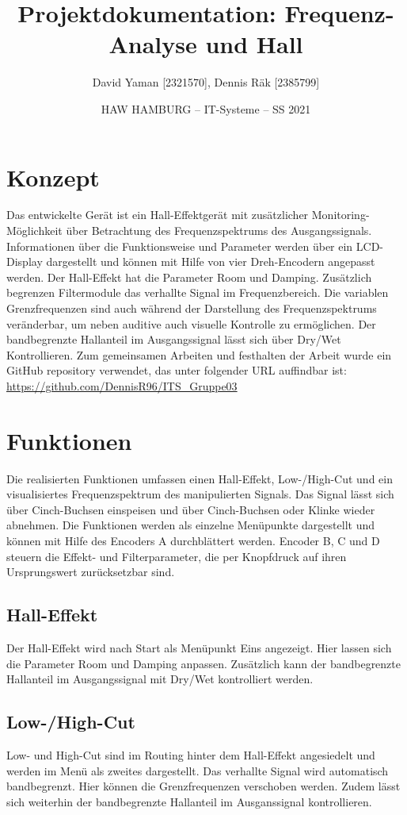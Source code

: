 \documentclass[12pt]{article}
\title{Projektdokumentation: Frequenz-Analyse und Hall}        %
\author{David Yaman [2321570], Dennis Räk [2385799]}            %
\date{HAW HAMBURG -- IT-Systeme -- SS 2021}                    %
\begin{document}
\maketitle
\newpage
\tableofcontents
\newpage
\section{Konzept}
Das entwickelte Gerät ist ein Hall-Effektgerät mit zusätzlicher Monitoring-Möglichkeit über Betrachtung des Frequenzspektrums des Ausgangssignals. 
Informationen über die Funktionsweise und Parameter werden über ein LCD-Display dargestellt und können mit Hilfe von vier Dreh-Encodern angepasst werden. 
Der Hall-Effekt hat die Parameter Room und Damping. Zusätzlich begrenzen Filtermodule das verhallte Signal im Frequenzbereich. 
Die variablen Grenzfrequenzen sind auch während der Darstellung des Frequenzspektrums veränderbar, um neben auditive auch visuelle Kontrolle zu ermöglichen. 
Der bandbegrenzte Hallanteil im Ausgangssignal lässt sich über Dry/Wet Kontrollieren. Zum gemeinsamen Arbeiten und festhalten der Arbeit wurde ein GitHub repository verwendet,
das unter folgender URL auffindbar ist:
\url{https://github.com/DennisR96/ITS_Gruppe03}
\section{Funktionen}
Die realisierten Funktionen umfassen einen Hall-Effekt, Low-/High-Cut und ein visualisiertes Frequenzspektrum des manipulierten Signals. 
Das Signal lässt sich über Cinch-Buchsen einspeisen und über Cinch-Buchsen oder Klinke wieder abnehmen.
Die Funktionen werden als einzelne Menüpunkte dargestellt und können mit Hilfe des Encoders A durchblättert werden. 
Encoder B, C und D steuern die Effekt- und Filterparameter, die per Knopfdruck auf ihren Ursprungswert zurücksetzbar sind.
\subsection{Hall-Effekt}
Der Hall-Effekt wird nach Start als Menüpunkt Eins angezeigt. 
Hier lassen sich die Parameter Room und Damping anpassen.
Zusätzlich kann der bandbegrenzte Hallanteil im Ausgangssignal mit Dry/Wet kontrolliert werden.
\subsection{Low-/High-Cut}
Low- und High-Cut sind im Routing hinter dem Hall-Effekt angesiedelt und werden im Menü als zweites dargestellt. 
Das verhallte Signal wird automatisch bandbegrenzt.  
Hier können die Grenzfrequenzen verschoben werden. 
Zudem lässt sich weiterhin der bandbegrenzte Hallanteil im Ausganssignal kontrollieren. 
\end{document}
